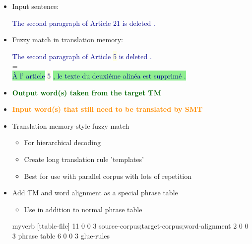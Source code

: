 \documentclass[landscape]{uedslides2C}
\newcommand{\example}[1]{\textcolor{darkblue}{\rm #1}}
\newcommand{\highlight}[1]{\colorbox{lightyellow}{#1}}
\newcommand{\highlightOrange}[1]{\colorbox{lightorange}{#1}}
\newcommand{\highlightGreen}[1]{\colorbox{lightgreen}{#1}}
\begin{document}
\begin{itemize}
\item Input sentence: \vspace{-5mm}
\begin{center}
\example{The second paragraph of Article \highlightOrange{21} is deleted .}
\end{center}
\item Fuzzy match in translation memory: \vspace{-5mm}
\begin{center}
\example{The second paragraph of Article \highlight{5} is deleted .}\\
=\\
\example{\highlightGreen{{\`A} l' article} \highlight{5} \highlightGreen{, le texte du deuxi{\'e}me alin{\'e}a est supprim{\'e} .}}
\end{center}
\item[] \textcolor{darkgreen}{\bf Output word(s) taken from the target TM}  \vspace{-5mm}
\item[] \textcolor{darkorange}{\bf Input word(s) that still need to be translated by SMT}
\end{itemize}




\begin{itemize} \itemsep -1mm
\item Translation memory-style fuzzy match
  \begin{itemize}
  \item For hierarchical decoding
  \item Create long translation rule 'templates'
  \item Best for use with parallel corpus with lots of repetition
  \end{itemize}

\item Add TM and word alignment as a special phrase table
  \begin{itemize}
    \item Use in addition to normal phrase table
  \end{itemize}
  \begin{SaveVerbatim}{myverb} 
   [ttable-file]
   11 0 0 3 source-corpus;target-corpus;word-alignment 
   2 0 0 3 phrase table
   6 0 0 3 glue-rules
  \end{SaveVerbatim}
  \colorbox{gray}{}

\end{itemize}
\end{document}
